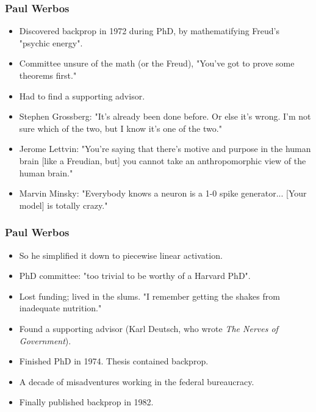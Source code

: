 \documentclass{beamer}
\begin{document}
\begin{frame}
\frametitle{Paul Werbos}

\begin{itemize}
    \item Discovered backprop in 1972 during PhD, by mathematifying Freud's "psychic energy".
    \item Committee unsure of the math (or the Freud), "You've got to prove some theorems first." 
    \item Had to find a supporting advisor.
    \item Stephen Grossberg: "It's already been done before. Or else it's wrong. I'm not sure which of the two, but I know it's one of the two."
    \item Jerome Lettvin: "You're saying that there's motive and purpose in the human brain [like a Freudian, but] you cannot take an anthropomorphic view of the human brain."
    \item Marvin Minsky: "Everybody knows a neuron is a 1-0 spike generator... [Your model] is totally crazy."
\end{itemize}
\end{frame}

\begin{frame}
\frametitle{Paul Werbos}
\begin{itemize}
    \item So he simplified it down to piecewise linear activation.
    \item PhD committee: "too trivial to be worthy of a Harvard PhD".
    \item Lost funding; lived in the slums. "I remember getting the shakes from inadequate nutrition."
    \item Found a supporting advisor (Karl Deutsch, who wrote \textit{The Nerves of Government}).
    \item Finished PhD in 1974. Thesis contained backprop.
    \item A decade of misadventures working in the federal bureaucracy.
    \item Finally published backprop in 1982.
\end{itemize}
\end{frame}
\end{document}
